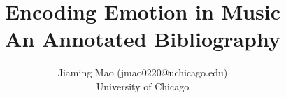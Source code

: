 \documentclass [12pt]{article}
\title{Encoding Emotion in Music\\\medskip An Annotated Bibliography}
\author{Jiaming Mao (jmao0220@uchicago.edu)\\University of Chicago}
\begin{document}
\maketitle
\nocite{*}


\end{document}
